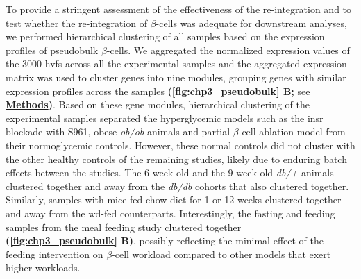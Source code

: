 \par To provide a stringent assessment of the effectiveness of the re-integration and to test whether the re-integration of $\beta$-cells was adequate for downstream analyses, we performed hierarchical clustering of all samples based on the expression profiles of pseudobulk $\beta$-cells. We aggregated the normalized expression values of the 3000 \glspl{hvf} across all the experimental samples and the aggregated expression matrix was used to cluster genes into nine modules, grouping genes with similar expression profiles across the samples \textbf{(\autoref{fig:chp3_pseudobulk} B;} see \hyperref[subsubsec:met_chp3_pseudo]{\textbf{Methods}}\textbf{)}. Based on these gene modules, hierarchical clustering of the experimental samples separated the hyperglycemic models such as the \gls{insr} blockade with S961, obese \textit{ob/ob} animals and partial $\beta$-cell ablation model from their normoglycemic controls. However, these normal controls did not cluster with the other healthy controls of the remaining studies, likely due to enduring batch effects between the studies. The 6-week-old and the 9-week-old \textit{db/+} animals clustered together and away from the \textit{db/db} cohorts that also clustered together. Similarly, samples with mice fed chow diet for 1 or 12 weeks clustered together and away from the \gls{wd}-fed counterparts. Interestingly, the fasting and feeding samples from the meal feeding study clustered together \textbf{(\autoref{fig:chp3_pseudobulk} B)}, possibly reflecting the minimal effect of the feeding intervention on $\beta$-cell workload compared to other models that exert higher workloads.\\

